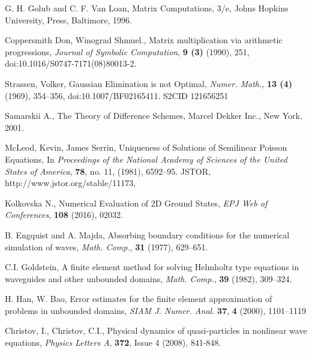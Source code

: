 \documentclass[a4paper]{article}
\theoremstyle{remark}
\begin{document}
\begin{large}
\begin{thebibliography}{99}
	 G. H. Golub and C. F. Van Loan, Matrix Computations, 3/e, Johns Hopkins University, Press, Baltimore, 1996.

	 Coppersmith Don, Winograd Shmuel., Matrix multiplication via arithmetic progressions,
{\it  Journal of Symbolic Computation}, \textbf{9 (3)} (1990), 251, doi:10.1016/S0747-7171(08)80013-2.

	 Strassen, Volker, Gaussian Elimination is not Optimal,
{\it Numer. Math.}, \textbf{13 (4)} (1969), 354–356, doi:10.1007/BF02165411. S2CID 121656251

	 Samarskii A., The Theory of Difference Schemes, Marcel Dekker Inc., New York, 2001.

	 McLeod, Kevin, James Serrin, Uniqueness of Solutions of Semilinear Poisson Equations, In {\it Proceedings of the National Academy of Sciences of the United States of America}, \textbf{78}, no. 11, (1981), 6592–95. JSTOR, http://www.jstor.org/stable/11173,

	 Kolkovska N., Numerical Evaluation of 2D Ground States,
\emph{ EPJ Web of Conferences}, \textbf{108} (2016), 02032.

	 B. Engquist and A. Majda, Absorbing boundary conditions for the numerical simulation of waves, {\it Math. Comp.}, \textbf{31} (1977), 629–651.

	 C.I. Goldstein, A finite element method for solving Helmholtz type equations in waveguides and other unbounded domains,
{\it Math. Comp.}, \textbf{39} (1982), 309–324.

	 H. Han, W. Bao, Error estimates for the finite element approximation of problems in unbounded domains,
{\it SIAM J. Numer. Anal.} \textbf{37}, \textbf{4} (2000), 1101–1119

	 Christov, I., Christov, C.I., Physical dynamics of quasi-particles in nonlinear wave equations,
{\it Physics Letters A}, \textbf{372}, Issue 4 (2008),  841-848.

\end{thebibliography}
\end{large}
\end{document}
